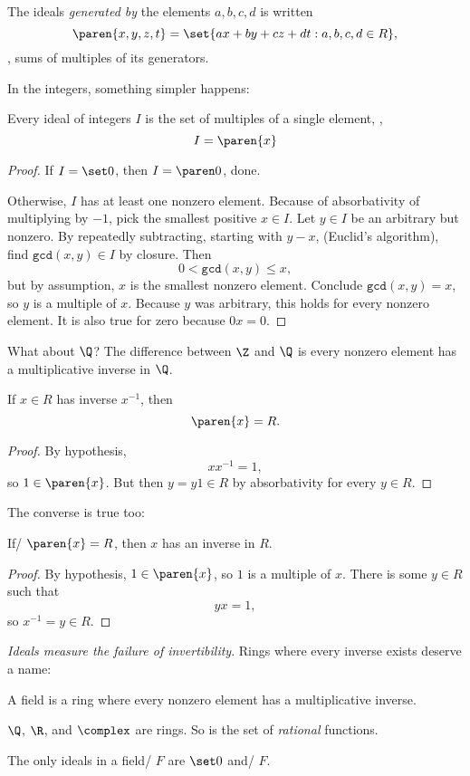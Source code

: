 \documentclass[a5paper]{scrartcl}
\theoremstyle{nonumberplain}
\begin{document}
The ideals \emph{generated by} the elements \(a,b,c,d\) is written
\[
  \paren{x,y,z,t} = \set{ax + by + cz + dt : a,b,c,d \in R},
\]
\ie, sums of multiples of its generators.

In the integers, something simpler happens:
\begin{theorem}
  Every ideal of integers \(I\) is the set of multiples of a single element, \ie,
  \[
    I = \paren{x}
  \]
\end{theorem}
\begin{proof}
  If \(I=\set 0\), then \(I=\paren 0\), done.

  Otherwise, \(I\) has at least one nonzero element. Because of absorbativity of multiplying by \(-1\), pick the smallest positive \(x\in I\). Let \(y\in I\) be an arbitrary but nonzero. By repeatedly subtracting, starting with \(y-x\), (Euclid's algorithm), find \(\texttt{gcd}(x,y)\in I\) by closure. Then
  \[
    0 < \texttt{gcd}(x,y) \leq x,
  \]
  but by assumption, \(x\) is the smallest nonzero element. Conclude \(\texttt{gcd}(x,y) =x\), so \(y\) is a multiple of \(x\). Because \(y\) was arbitrary, this holds for every nonzero element. It is also true for zero because \(0x=0\).
\end{proof}

What about \(\Q\)? The difference between \(\Z\) and \(\Q\) is every nonzero element has a multiplicative inverse in \(\Q\).
\begin{theorem}
  If \(x\in R\) has inverse \(x^{-1}\), then
  \[
    \paren{x} = R.
  \]
\end{theorem}
\begin{proof}
  By hypothesis,
  \[
    xx^{-1} = 1,
  \]
  so \(1\in \paren{x}\). But then \(y = y1 \in R\) by absorbativity for every \(y\in R\).
\end{proof}
The converse is true too:
\begin{theorem}
  If\eit/ \(\paren{x}=R\), then \(x\) has an inverse in \(R\).
\end{theorem}
\begin{proof}
  By hypothesis, \(1\in\paren{x}\), so \(1\) is a multiple of \(x\). There is some \(y\in R\) such that
  \[
    yx = 1,
  \]
  so \(x^{-1}=y\in R\).
\end{proof}
\emph{Ideals measure the failure of invertibility}.
Rings where every inverse exists deserve a name:
\begin{defn}[Field]
  A field is a ring where every nonzero element has a multiplicative inverse.
\end{defn}
\(\Q\), \(\R\), and \(\complex\) are rings. So is the set of \emph{rational} functions.
\begin{cor}
  The only ideals in a field\eit/ \(F\) are  \(\set 0\) and\eit/ \(F\).
\end{cor}
\end{document}
